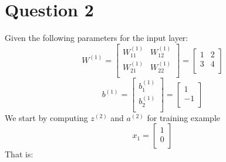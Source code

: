 \documentclass[leqno]{article}
\begin{document}
\section*{Question 2} Given the following parameters for the input layer:
\[
W^{(1)} =
  \begin{bmatrix}
  W_{11}^{(1)} & W_{12}^{(1)}\\
  W_{21}^{(1)} & W_{22}^{(1)}\\ 
  \end{bmatrix}
  =
  \begin{bmatrix}
  1 & 2\\
  3 & 4\\ 
  \end{bmatrix}
\]
\[
b^{(1)} =
   \begin{bmatrix}
  b_1^{(1)} \\
  b_2^{(1)}\\ 
  \end{bmatrix}
  =
  \begin{bmatrix}
  1 \\
  -1\\ 
  \end{bmatrix}
\]
We start by computing $z^{(2)}$ and $a^{(2)}$ for training example 
\[
x_1 =
  \begin{bmatrix}
  1\\
  0\\ 
  \end{bmatrix}
\]
That is: 
\end{document}
